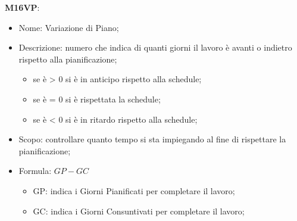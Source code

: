 \textbf{M16VP}:
\begin{itemize}
    \item Nome: Variazione di Piano;
    \item Descrizione: numero che indica di quanti giorni il lavoro è avanti o indietro rispetto alla pianificazione;
         \begin{itemize}
            \item se è > 0 si è in anticipo rispetto alla schedule;
            \item se è = 0 si è rispettata la schedule;
            \item se è < 0 si è in ritardo rispetto alla schedule;
        \end{itemize}
    \item Scopo: controllare quanto tempo si sta impiegando al fine di rispettare la pianificazione;
    \item Formula: $ GP - GC $
        \begin{itemize}
            \item GP: indica i Giorni Pianificati per completare il lavoro;
            \item GC: indica i Giorni Consuntivati per completare il lavoro;
        \end{itemize}
\end{itemize}